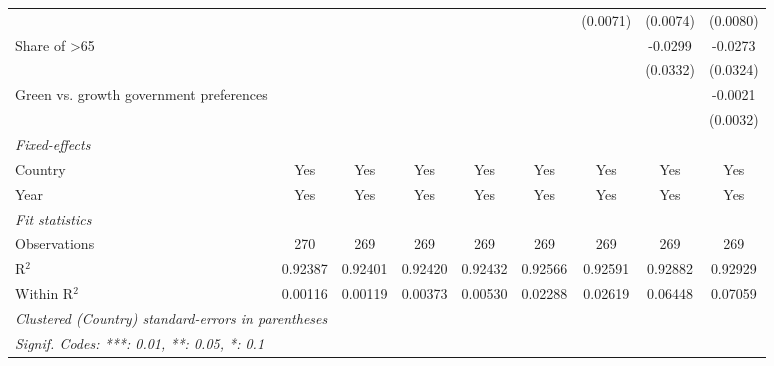 \begin{table}[htbp]
\begin{tabular}{lcccccccc}
                                                               &          &          &          &          &          & (0.0071) & (0.0074) & (0.0080)\\   
      Share of >65                                             &          &          &          &          &          &          & -0.0299  & -0.0273\\   
                                                               &          &          &          &          &          &          & (0.0332) & (0.0324)\\   
      Green vs. growth government preferences                  &          &          &          &          &          &          &          & -0.0021\\   
                                                               &          &          &          &          &          &          &          & (0.0032)\\   
      \midrule
      \emph{Fixed-effects}\\
      Country                                                  & Yes      & Yes      & Yes      & Yes      & Yes      & Yes      & Yes      & Yes\\  
      Year                                                     & Yes      & Yes      & Yes      & Yes      & Yes      & Yes      & Yes      & Yes\\  
      \midrule
      \emph{Fit statistics}\\
      Observations                                             & 270      & 269      & 269      & 269      & 269      & 269      & 269      & 269\\  
      R$^2$                                                    & 0.92387  & 0.92401  & 0.92420  & 0.92432  & 0.92566  & 0.92591  & 0.92882  & 0.92929\\  
      Within R$^2$                                             & 0.00116  & 0.00119  & 0.00373  & 0.00530  & 0.02288  & 0.02619  & 0.06448  & 0.07059\\  
      \midrule \midrule
      \multicolumn{9}{l}{\emph{Clustered (Country) standard-errors in parentheses}}\\
      \multicolumn{9}{l}{\emph{Signif. Codes: ***: 0.01, **: 0.05, *: 0.1}}\\
   \end{tabular}
\end{table}


